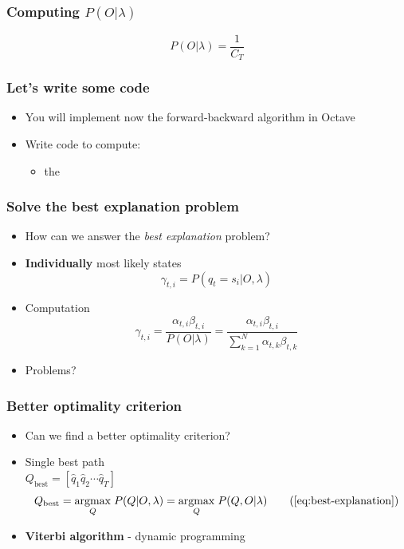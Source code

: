 \documentclass{beamer}
\begin{document}
\begin{frame}
  \frametitle{Computing $P(O | \lambda)$}
  \begin{equation}
    \label{eq:scaled-probability}
    P(O \vert \lambda) = \frac{1}{C_T}
  \end{equation}
\end{frame}


\begin{frame}
  \frametitle{Let's write some code}
  \begin{itemize}
  \item You will implement now the forward-backward algorithm in
    Octave
  \item Write code to compute:
    \begin{itemize}
    \item the
    \end{itemize}

  \end{itemize}
\end{frame}

\begin{frame}
  \frametitle{Solve the best explanation problem}
  \begin{itemize}
  \item How can we answer the \emph{best explanation} problem?  \pause
  \item \textbf{Individually} most likely states
    \begin{equation}
      \label{eq:individually}
      \gamma_{t,i}=P(q_t = s_i \vert O, \lambda)
    \end{equation}
    \pause
  \item Computation
    \begin{equation}
      \label{eq:gamma_formula}
      \gamma_{t,i}=\frac{\alpha_{t,i}\beta_{t,i}}{P(O\vert \lambda)} =
      \frac{\alpha_{t,i}\beta_{t,i}}{\displaystyle\sum_{k=1}^{N}\alpha_{t,k}\beta_{t,k}}
    \end{equation}
    \pause
  \item Problems?
  \end{itemize}
\end{frame}

\begin{frame}
  \frametitle{Better optimality criterion}
  \begin{itemize}
  \item Can we find a better optimality criterion?  \pause
  \item Single best path \\
    $Q_{\text{best}} = [\hat{q}_1 \hat{q}_2 \cdots \hat{q}_T]$
    \begin{equation}
      Q_{\text{best}} = \underset{Q}{\operatorname{argmax}}\;
      P(Q \vert O, \lambda)
      = \underset{Q}{\operatorname{argmax}}\; P(Q, O \vert \lambda)
      \tag{\ref{eq:best-explanation}}
    \end{equation}
  \item \textbf{Viterbi algorithm} - dynamic programming
  \end{itemize}
\end{frame}
\end{document}
